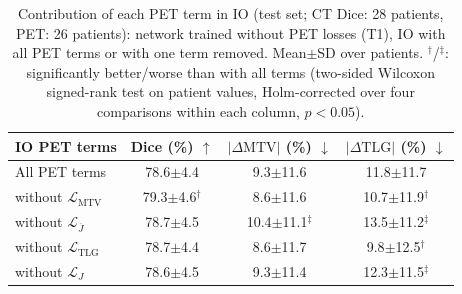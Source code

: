\begin{table}[t]
\centering
\caption{Contribution of each PET term in IO (test set; CT Dice: 28 patients, PET: 26 patients): network trained without PET losses (T1), IO with all PET terms or with one term removed. Mean$\pm$SD over patients. $^{\dagger}$/$^{\ddagger}$: significantly better/worse than with all terms (two-sided Wilcoxon signed-rank test on patient values, Holm-corrected over four comparisons within each column, $p<0.05$).}
\label{tab:loo}
\scriptsize
\setlength{\tabcolsep}{3pt}
\begin{tabular}{lccc}
\toprule
IO PET terms & Dice (\%) $\uparrow$ & $|\Delta\mathrm{MTV}|$ (\%) $\downarrow$ & $|\Delta\mathrm{TLG}|$ (\%) $\downarrow$ \\
\midrule
All PET terms & 78.6$\pm$4.4 & 9.3$\pm$11.6 & 11.8$\pm$11.7 \\
\midrule
without $\mathcal{L}_{\mathrm{MTV}}$ & 79.3$\pm$4.6$^{\dagger}$ & 8.6$\pm$11.6 & 10.7$\pm$11.9$^{\dagger}$ \\
without $\mathcal{L}_{\overline{J}}$ & 78.7$\pm$4.5 & 10.4$\pm$11.1$^{\ddagger}$ & 13.5$\pm$11.2$^{\ddagger}$ \\
without $\mathcal{L}_{\mathrm{TLG}}$ & 78.7$\pm$4.4 & 8.6$\pm$11.7 & 9.8$\pm$12.5$^{\dagger}$ \\
without $\mathcal{L}_{J}$ & 78.6$\pm$4.5 & 9.3$\pm$11.4 & 12.3$\pm$11.5$^{\ddagger}$ \\
\bottomrule
\end{tabular}
\end{table}
